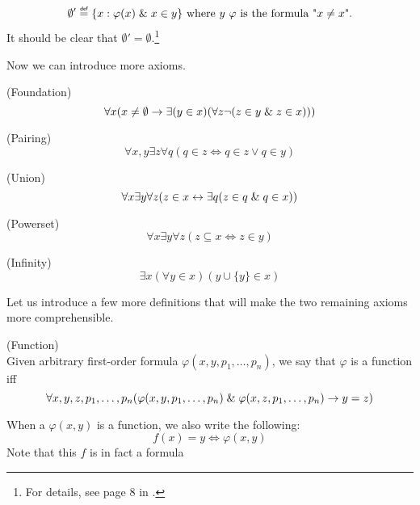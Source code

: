 \begin{equation}
\emptyset' \defeq \{x : \varphi(x) \et x \in y\}\mbox{ where $y$ $\varphi$ is the formula "$x \neq x$".}
\end{equation}
It should be clear that $\emptyset' = \emptyset$.\footnote{For details, see page 8 in \cite{JechBook}.}

Now we can introduce more axioms.
\begin{definition}{(Foundation)}\label{def:foundation}
\begin{equation}
\forall x (x \neq \emptyset \rightarrow \exists (y \in x) (\forall z \neg (z \in y \mathrel{\&} z \in x)))
\end{equation}
\end{definition}

\begin{definition}{(Pairing)}\label{def:pairing}
\begin{equation}
\forall x, y \exists z \forall q (q \in z \iff q \in z \lor q \in y)
\end{equation}
\end{definition}

\begin{definition}{(Union)}\label{def:union}
\begin{equation}
\forall x \exists y \forall z (z \in x \leftrightarrow \exists q( z \in q \mathrel{\&} q \in x))
\end{equation}
\end{definition}

\begin{definition}{(Powerset)}\label{def:powerset}
\begin{equation}
\forall x \exists y \forall z (z \subseteq x \iff z \in y)
\end{equation}
\end{definition}

\begin{definition}{(Infinity)}\label{def:infinity}
\begin{equation}
\exists x (\forall y \in x)(y\cup\{y\} \in x)
\end{equation}
\end{definition}

Let us introduce a few more definitions that will make the two remaining axioms more comprehensible.
\begin{definition}{(Function)}\label{def:function}\\
Given arbitrary first-order formula $\varphi(x, y, p_1, \ldots, p_n)$, we say that $\varphi$ is a function iff
\begin{equation}\label{def:function_formula}
\forall x, y, z, p_1, \ldots, p_n (\varphi(x, y, p_1, \ldots, p_n) \mathrel{\&} \varphi(x, z, p_1, \ldots, p_n) \rightarrow y = z)
\end{equation}
\end{definition}
When a $\varphi(x, y)$ is a function, we also write the following:
\begin{equation}
f(x) = y \iff \varphi(x, y)
\end{equation}
Note that this $f$ is in fact  a formula 

